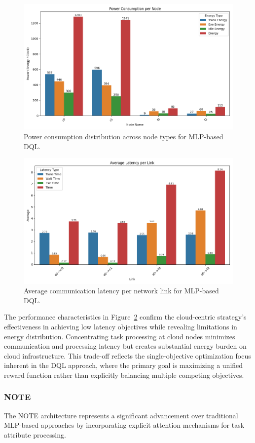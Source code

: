 \documentclass[preprint,3p,authoryear]{elsarticle}
\begin{document}
\begin{figure}[H]
    \centering
    \includegraphics[width=0.5\linewidth]{figs/MLP/power_consumption_per_node.png}
    \caption{Power consumption distribution across node types for MLP-based DQL.}
    \label{fig:mlp-power-consumption}
\end{figure}

\begin{figure}[H]
    \centering
    \includegraphics[width=0.5\linewidth]{figs/MLP/avg_latency_per_link.png}
    \caption{Average communication latency per network link for MLP-based DQL.}
    \label{fig:mlp-avg-latency}
\end{figure}

The performance characteristics in Figure~\ref{fig:mlp-avg-latency} confirm the cloud-centric strategy's effectiveness in achieving low latency objectives while revealing limitations in energy distribution. Concentrating task processing at cloud nodes minimizes communication and processing latency but creates substantial energy burden on cloud infrastructure. This trade-off reflects the single-objective optimization focus inherent in the DQL approach, where the primary goal is maximizing a unified reward function rather than explicitly balancing multiple competing objectives.

\subsubsection{NOTE}

The NOTE architecture represents a significant advancement over traditional MLP-based approaches by incorporating explicit attention mechanisms for task attribute processing. 
\end{document}
